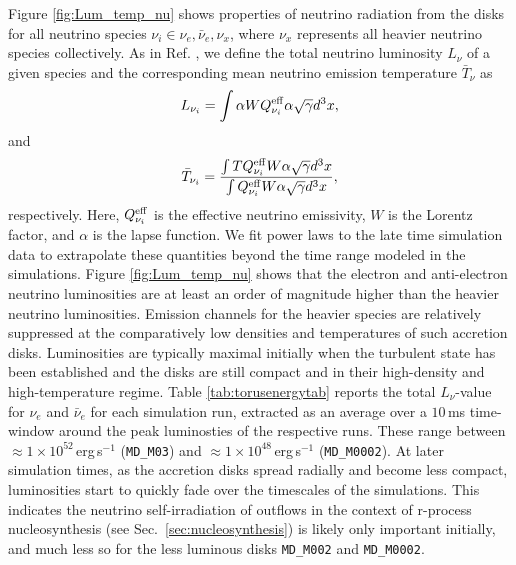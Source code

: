 Figure \ref{fig:Lum_temp_nu} shows properties of neutrino radiation from the disks for all neutrino species $\nu_i \in {\nu_{e}, \bar \nu_{e}, \nu_{x}}$, where $\nu_{x}$ represents all heavier neutrino species collectively. As in Ref. \cite{Siegel:2017jug}, we define the total neutrino luminosity $L_\nu$ of a given species and the corresponding mean neutrino emission temperature $\bar T_\nu$ as
\begin{equation}
    L_{\nu_i} = \int \alpha W Q_{\nu_i}^{\rm eff} \alpha\sqrt{\gamma}d^{3}x,
\end{equation}
and
\begin{equation}
    \bar T_{\nu_i} = \frac{\int TQ_{\nu_i}^{\rm eff}W\alpha\sqrt{\gamma}d^{3}x}{\int Q_{\nu_i}^{\rm eff}W\alpha\sqrt{\gamma}d^{3}x},
\end{equation}
respectively. Here, $Q_{\nu_i}^{\rm eff}$ is the effective neutrino emissivity, $W$ is the Lorentz factor, and $\alpha$ is the lapse function. We fit power laws to the late time simulation data to extrapolate these quantities beyond the time range modeled in the simulations. Figure \ref{fig:Lum_temp_nu} shows that the electron and anti-electron neutrino luminosities are at least an order of magnitude higher than the heavier neutrino luminosities. Emission channels for the heavier species are relatively suppressed at the comparatively low densities and temperatures of such accretion disks. Luminosities are typically maximal initially when the turbulent state has been established and the disks are still compact and in their high-density and high-temperature regime. Table \ref{tab:torusenergytab} reports the total $L_\nu$-value for $\nu_e$ and $\bar{\nu}_e$ for each simulation run, extracted as an average over a $10$\,ms time-window around the peak luminosties of the respective runs. These range between $\approx\!1\times 10^{52}$\,erg\,s$^{-1}$ (\texttt{MD\_M03}) and $\approx\!1\times 10^{48}$\,erg\,s$^{-1}$ (\texttt{MD\_M0002}). %
At later simulation times, as the accretion disks spread radially and become less compact, luminosities start to quickly fade over the timescales of the simulations. This indicates the neutrino self-irradiation of outflows in the context of r-process nucleosynthesis (see Sec.~\ref{sec:nucleosynthesis}) is likely only important initially, and much less so for the less luminous disks \texttt{MD\_M002} and \texttt{MD\_M0002}.




